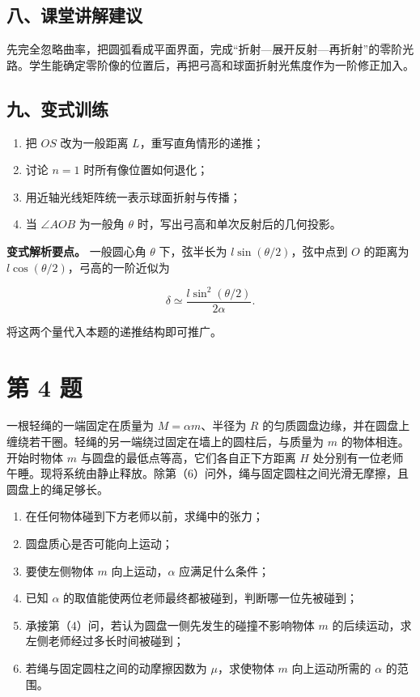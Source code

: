 \documentclass[12pt,a4paper,UTF8]{ctexart}
\newcommand{\tightlist}{\setlength{\itemsep}{0pt}\setlength{\parskip}{0pt}}
\begin{document}
\subsection{八、课堂讲解建议}\label{ux516bux8bfeux5802ux8bb2ux89e3ux5efaux8bae-2}

先完全忽略曲率，把圆弧看成平面界面，完成``折射---展开反射---再折射''的零阶光路。学生能确定零阶像的位置后，再把弓高和球面折射光焦度作为一阶修正加入。

\subsection{九、变式训练}\label{ux4e5dux53d8ux5f0fux8badux7ec3-2}

\begin{enumerate}
\def\labelenumi{\arabic{enumi}.}
\tightlist
\item
  把 \(OS\) 改为一般距离 \(L\)，重写直角情形的递推；
\item
  讨论 \(n=1\) 时所有像位置如何退化；
\item
  用近轴光线矩阵统一表示球面折射与传播；
\item
  当 \(\angle AOB\) 为一般角 \(\theta\)
  时，写出弓高和单次反射后的几何投影。
\end{enumerate}

\textbf{变式解析要点。} 一般圆心角 \(\theta\) 下，弦半长为
\(l\sin(\theta/2)\)，弦中点到 \(O\) 的距离为
\(l\cos(\theta/2)\)，弓高的一阶近似为

\[
\delta\simeq
\frac{l\sin^2(\theta/2)}{2\alpha}.
\]

将这两个量代入本题的递推结构即可推广。

\newpage

\section{第 4 题}\label{ux7b2c-4-ux9898}

一根轻绳的一端固定在质量为 \(M=\alpha m\)、半径为 \(R\)
的匀质圆盘边缘，并在圆盘上缠绕若干圈。轻绳的另一端绕过固定在墙上的圆柱后，与质量为
\(m\) 的物体相连。开始时物体 \(m\)
与圆盘的最低点等高，它们各自正下方距离 \(H\)
处分别有一位老师午睡。现将系统由静止释放。除第（6）问外，绳与固定圆柱之间光滑无摩擦，且圆盘上的绳足够长。

\begin{enumerate}
\def\labelenumi{\arabic{enumi}.}
\tightlist
\item
  在任何物体碰到下方老师以前，求绳中的张力；
\item
  圆盘质心是否可能向上运动；
\item
  要使左侧物体 \(m\) 向上运动，\(\alpha\) 应满足什么条件；
\item
  已知 \(\alpha\) 的取值能使两位老师最终都被碰到，判断哪一位先被碰到；
\item
  承接第（4）问，若认为圆盘一侧先发生的碰撞不影响物体 \(m\)
  的后续运动，求左侧老师经过多长时间被碰到；
\item
  若绳与固定圆柱之间的动摩擦因数为 \(\mu\)，求使物体 \(m\)
  向上运动所需的 \(\alpha\) 的范围。
\end{enumerate}
\end{document}
